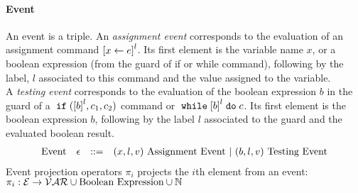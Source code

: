 \paragraph*{Event}
An event is a triple.
An \emph{assignment event} corresponds to the evaluation of an assignment command $\clabel{\assign{x}{\expr}}^l$.
Its first element is the variable name $x$,
or a boolean expression (from the guard of if or while command), 
following by 
 the label, $l$ associated to this command and the value assigned to the variable.
 \\
 A \emph{testing event} corresponds to the evaluation of the boolean expression $b$ in the guard of a $\eif(\clabel{b}^l, c_1, c_2)$ command or $\ewhile \clabel{b}^l \edo c$.
 Its first element is the boolean expression $b$, following by 
 the label $l$ associated to the guard and the evaluated boolean result.
%
\[
\begin{array}{llll}
  \mbox{Event} 
  & {\mathtt{\epsilon}} & ::= & 
  ({x}, l, v) ~ \mbox{Assignment Event} 
  ~|~(b, l, v) ~ \mbox{Testing Event}
\end{array}
\]
Event projection operators $\pi_i$ projects the $i$th element from an event: 
\\
$\pi_i : 
\mathcal{E} \to \mathcal{VAR}\cup \mbox{Boolean Expression}  \cup \mathbb{N} $
